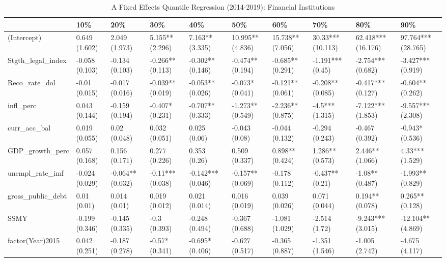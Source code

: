 \begin{table}[ht]
\centering
\caption{A Fixed Effects Quantile Regression (2014-2019): Financial Institutions} 
\begingroup\small
\begin{tabular}{llllllllll}
  \toprule
 & 10\% & 20\% & 30\% & 40\% & 50\% & 60\% & 70\% & 80\% & 90\% \\ 
  \midrule
(Intercept) & 0.649 (1.602) & 2.049 (1.973) & 5.155** (2.296) & 7.163** (3.335) & 10.995** (4.836) & 15.738** (7.056) & 30.33*** (10.113) & 62.418*** (16.176) & 97.764*** (28.765) \\ 
  Stgth\_legal\_index & -0.058 (0.103) & -0.134 (0.103) & -0.266** (0.113) & -0.302** (0.146) & -0.474** (0.194) & -0.685** (0.291) & -1.191*** (0.45) & -2.754*** (0.682) & -3.427*** (0.919) \\ 
  Reco\_rate\_dol & -0.01 (0.015) & -0.017 (0.016) & -0.039** (0.019) & -0.053** (0.026) & -0.073* (0.041) & -0.121** (0.061) & -0.208** (0.085) & -0.417*** (0.127) & -0.604** (0.262) \\ 
  infl\_perc & 0.043 (0.144) & -0.159 (0.194) & -0.407* (0.231) & -0.707** (0.333) & -1.273** (0.549) & -2.236** (0.875) & -4.5*** (1.315) & -7.122*** (1.853) & -9.557*** (2.308) \\ 
  curr\_acc\_bal & 0.019 (0.055) & 0.02 (0.048) & 0.032 (0.051) & 0.025 (0.06) & -0.043 (0.08) & -0.044 (0.132) & -0.294 (0.243) & -0.467 (0.392) & -0.943* (0.536) \\ 
  GDP\_growth\_perc & 0.057 (0.168) & 0.156 (0.171) & 0.277 (0.226) & 0.353 (0.26) & 0.509 (0.337) & 0.898** (0.424) & 1.286** (0.573) & 2.446** (1.066) & 4.33*** (1.529) \\ 
  unempl\_rate\_imf & -0.024 (0.029) & -0.064** (0.032) & -0.11*** (0.038) & -0.142*** (0.046) & -0.157** (0.069) & -0.178 (0.112) & -0.437** (0.21) & -1.08** (0.487) & -1.993** (0.829) \\ 
  gross\_public\_debt & 0.01 (0.01) & 0.014 (0.01) & 0.019 (0.012) & 0.021 (0.014) & 0.016 (0.019) & 0.039 (0.026) & 0.071 (0.044) & 0.194** (0.078) & 0.265** (0.128) \\ 
  SSMY & -0.199 (0.346) & -0.145 (0.335) & -0.3 (0.393) & -0.248 (0.494) & -0.367 (0.688) & -1.081 (1.029) & -2.514 (1.72) & -9.243*** (3.015) & -12.104** (4.869) \\ 
  factor(Year)2015 & 0.042 (0.251) & -0.187 (0.278) & -0.57* (0.341) & -0.695* (0.406) & -0.627 (0.517) & -0.365 (0.887) & -1.351 (1.546) & -1.005 (2.742) & -4.675 (4.117) \\ 

\end{tabular}
\end{table}
